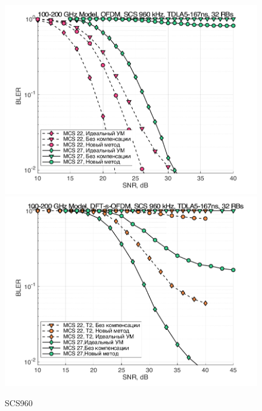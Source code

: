 \begin{figure}[h!]
    \centering
    \includegraphics[width=0.49\linewidth]{figs/res/ofdm/OFDM_SubTHz_SCS960_MCS22_27.png}
    \includegraphics[width=0.49\linewidth]{figs/res/dftsofdm/DFT-s-OFDM_SubTHz_SCS960_MCS22_27.png}
    \caption{SCS960}
    \label{fig:res100200_scs960}
\end{figure}




